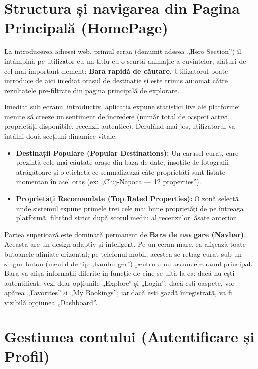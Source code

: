 \documentclass[12pt,a4paper,oneside]{report}
\begin{document}
\section{Structura și navigarea din Pagina Principală (HomePage)}

La introducerea adresei web, primul ecran (denumit adesea „Hero Section'') îl întâmpină pe utilizator cu un titlu cu o scurtă animație a cuvintelor, alături de cel mai important element: \textbf{Bara rapidă de căutare}. Utilizatorul poate introduce de aici imediat orașul de destinație și este trimis automat către rezultatele pre-filtrate din pagina principală de explorare.

Imediat sub ecranul introductiv, aplicația expune statistici live ale platformei menite să creeze un sentiment de încredere (număr total de oaspeți activi, proprietăți disponibile, recenzii autentice).
Derulând mai jos, utilizatorul va întâlni două secțiuni dinamice vitale:
\begin{itemize}
    \item \textbf{Destinații Populare (Popular Destinations):} Un carusel curat, care prezintă cele mai căutate orașe din baza de date, însoțite de fotografii atrăgătoare și o etichetă ce semnalizează câte proprietăți sunt listate momentan în acel oraș (ex: „Cluj-Napoca — 12 properties'').
    \item \textbf{Proprietăți Recomandate (Top Rated Properties):} O zonă selectă unde sistemul expune primele trei cele mai bune proprietăți de pe întreaga platformă, filtrând strict după scorul mediu al recenziilor lăsate anterior.
\end{itemize}

Partea superioară este dominată permanent de \textbf{Bara de navigare (Navbar)}. Aceasta are un design adaptiv și inteligent. Pe un ecran mare, ea afișează toate butoanele aliniate orizontal; pe telefonul mobil, acestea se retrag curat sub un singur buton (meniul de tip „hamburger'') pentru a nu ascunde ecranul principal. 
Bara va afișa informații diferite în funcție de cine se uită la ea: dacă nu ești autentificat, vezi doar opțiunile „Explore'' și „Login''; dacă ești oaspete, vor apărea „Favorites'' și „My Bookings''; iar dacă ești gazdă înregistrată, va fi vizibilă opțiunea „Dashboard''.

\section{Gestiunea contului (Autentificare și Profil)}
\end{document}
